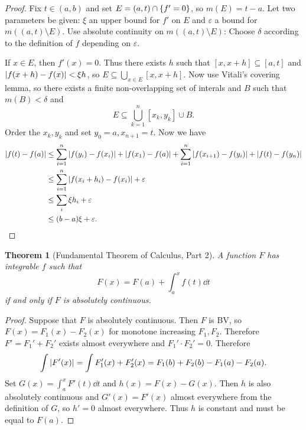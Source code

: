 \documentclass[leqno, openany]{memoir}
\newtheorem{thm}{Theorem}[chapter]
\theoremstyle{definition}
\theoremstyle{remark}
\theoremstyle{plain}
\theoremstyle{definition}
\theoremstyle{remark}
\newcommand{\ep}{\varepsilon}
\begin{document}
\begin{proof} Fix $t \in (a,b)$ and set $E = (a,t) \cap \qty{f' = 0}$, so $m(E)
    = t-a$. Let two parameters be given: $\xi$ an upper bound for $f'$ on $E$
    and $\ep$ a bound for $m((a,t) \setminus E)$. Use absolute continuity on
    $m((a,t) \setminus E)$: Choose $\delta$ according to the definition of $f$
    depending on $\ep$.

    If $x \in E$, then $f'(x) = 0$. Thus there exists $h$ such that $[x,x+h]
    \subseteq [a,t]$ and $\abs{f(x+h) - f(x)} < \xi h$, so $E \subseteq
    \bigcup_{x \in E} [x,x+h]$. Now use Vitali's covering lemma, so there
    exists a finite non-overlapping set of interals and $B$ such that $m(B) <
    \delta$ and \[ E \subseteq \bigcup_{k=1}^n [x_k,y_k] \cup B. \] Order the
    $x_k,y_k$ and set $y_0 = a, x_{n+1} = t$. Now we have \begin{align*}
        \abs{f(t) - f(a)} &\leq \sum_{i=1}^n \abs{f(y_i) - f(x_i)} +
        \abs{f(x_1) - f(a)} + \sum_{i=1}^n \abs{f(x_{i+1}) - f(y_i)} +
        \abs{f(t) - f(y_n)} \\ &\leq \sum_{i=1}^n \abs{f(x_i + h_i) - f(x_i)} +
    \ep \\ &\leq \sum_i \xi h_i + \ep \\ &\leq (b-a) \xi + \ep. \qedhere
\end{align*} \end{proof}

\begin{thm}[Fundamental Theorem of Calculus, Part 2] A function $F$ has
    integrable $f$ such that \[ F(x) = F(a) + \int_a^x f(t) \dd{t} \] if and
only if $F$ is absolutely continuous.  \end{thm}

\begin{proof} Suppose that $F$ is absolutely continuous. Then $F$ is BV, so
    $F(x) = F_1(x) - F_2(x)$ for monotone increasing $F_1, F_2$. Therefore $F'
    = F_1' + F_2'$ exists almost everywhere and $F_1' \cdot F_2' = 0$.
    Therefore \[ \int \abs{F'(x)} = \int F_1'(x) + F_2'(x) = F_1(b) + F_2(b) -
    F_1(a) - F_2(a). \] Set $G(x) = \int_a^x F'(t) \dd{t}$ and $h(x) = F(x) -
    G(x)$. Then $h$ is also absolutely continuous and $G'(x) = F'(x)$ almost
    everywhere from the definition of $G$, so $h' = 0$ almost everywhere. Thus
    $h$ is constant and must be equal to $F(a)$.  \end{proof}
\end{document}
